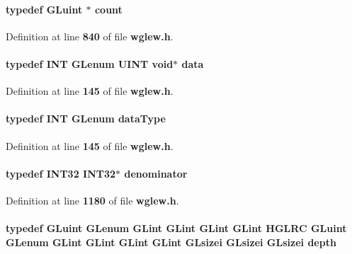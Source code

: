 \paragraph[{count}]{\setlength{\rightskip}{0pt plus 5cm}typedef {\bf G\+Luint} $\ast$ {\bf count}}\label{wglew_8h_a10b284d589000663becfbc6867a3a9f7}


Definition at line {\bf 840} of file {\bf wglew.\+h}.

\paragraph[{data}]{\setlength{\rightskip}{0pt plus 5cm}typedef {\bf I\+NT} {\bf G\+Lenum} {\bf U\+I\+NT} {\bf void}$\ast$ {\bf data}}\label{wglew_8h_a465dec1ce63d00e7ee74e136a178c031}


Definition at line {\bf 145} of file {\bf wglew.\+h}.

\paragraph[{data\+Type}]{\setlength{\rightskip}{0pt plus 5cm}typedef {\bf I\+NT} {\bf G\+Lenum} {\bf data\+Type}}\label{wglew_8h_a9798df3a48c4765477ecd49b3383c0f8}


Definition at line {\bf 145} of file {\bf wglew.\+h}.

\paragraph[{denominator}]{\setlength{\rightskip}{0pt plus 5cm}typedef I\+N\+T32 I\+N\+T32$\ast$ {\bf denominator}}\label{wglew_8h_a39c8938d48dd25ea293b00ec2f0fb3cc}


Definition at line {\bf 1180} of file {\bf wglew.\+h}.

\paragraph[{depth}]{\setlength{\rightskip}{0pt plus 5cm}typedef {\bf G\+Luint} {\bf G\+Lenum} {\bf G\+Lint} {\bf G\+Lint} {\bf G\+Lint} {\bf G\+Lint} {\bf H\+G\+L\+RC} {\bf G\+Luint} {\bf G\+Lenum} {\bf G\+Lint} {\bf G\+Lint} {\bf G\+Lint} {\bf G\+Lint} {\bf G\+Lsizei} {\bf G\+Lsizei} {\bf G\+Lsizei} {\bf depth}}\label{wglew_8h_ada6e480a6a74d7ec54bf8f34626976bb}


